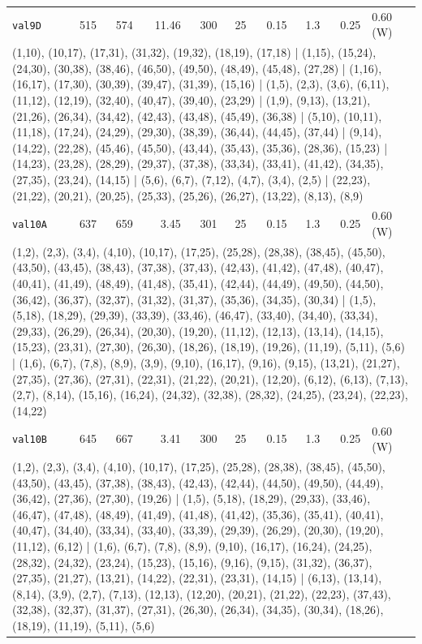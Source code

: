 \begin{longtable}{lrrrrrrrrl}
\texttt{val9D} & 515 & 574 & 11.46 & 300 & 25 & 0.15 & 1.3 & 0.25 & 0.60\,(W) \\
\multicolumn{10}{p{0.96\linewidth}}{\tiny\raggedright\arraybackslash (1,10), (10,17), (17,31), (31,32), (19,32), (18,19), (17,18) | (1,15), (15,24), (24,30), (30,38), (38,46), (46,50), (49,50), (48,49), (45,48), (27,28) | (1,16), (16,17), (17,30), (30,39), (39,47), (31,39), (15,16) | (1,5), (2,3), (3,6), (6,11), (11,12), (12,19), (32,40), (40,47), (39,40), (23,29) | (1,9), (9,13), (13,21), (21,26), (26,34), (34,42), (42,43), (43,48), (45,49), (36,38) | (5,10), (10,11), (11,18), (17,24), (24,29), (29,30), (38,39), (36,44), (44,45), (37,44) | (9,14), (14,22), (22,28), (45,46), (45,50), (43,44), (35,43), (35,36), (28,36), (15,23) | (14,23), (23,28), (28,29), (29,37), (37,38), (33,34), (33,41), (41,42), (34,35), (27,35), (23,24), (14,15) | (5,6), (6,7), (7,12), (4,7), (3,4), (2,5) | (22,23), (21,22), (20,21), (20,25), (25,33), (25,26), (26,27), (13,22), (8,13), (8,9)} \\[2pt]
\texttt{val10A} & 637 & 659 & 3.45 & 301 & 25 & 0.15 & 1.3 & 0.25 & 0.60\,(W) \\
\multicolumn{10}{p{0.96\linewidth}}{\tiny\raggedright\arraybackslash (1,2), (2,3), (3,4), (4,10), (10,17), (17,25), (25,28), (28,38), (38,45), (45,50), (43,50), (43,45), (38,43), (37,38), (37,43), (42,43), (41,42), (47,48), (40,47), (40,41), (41,49), (48,49), (41,48), (35,41), (42,44), (44,49), (49,50), (44,50), (36,42), (36,37), (32,37), (31,32), (31,37), (35,36), (34,35), (30,34) | (1,5), (5,18), (18,29), (29,39), (33,39), (33,46), (46,47), (33,40), (34,40), (33,34), (29,33), (26,29), (26,34), (20,30), (19,20), (11,12), (12,13), (13,14), (14,15), (15,23), (23,31), (27,30), (26,30), (18,26), (18,19), (19,26), (11,19), (5,11), (5,6) | (1,6), (6,7), (7,8), (8,9), (3,9), (9,10), (16,17), (9,16), (9,15), (13,21), (21,27), (27,35), (27,36), (27,31), (22,31), (21,22), (20,21), (12,20), (6,12), (6,13), (7,13), (2,7), (8,14), (15,16), (16,24), (24,32), (32,38), (28,32), (24,25), (23,24), (22,23), (14,22)} \\[2pt]
\texttt{val10B} & 645 & 667 & 3.41 & 300 & 25 & 0.15 & 1.3 & 0.25 & 0.60\,(W) \\
\multicolumn{10}{p{0.96\linewidth}}{\tiny\raggedright\arraybackslash (1,2), (2,3), (3,4), (4,10), (10,17), (17,25), (25,28), (28,38), (38,45), (45,50), (43,50), (43,45), (37,38), (38,43), (42,43), (42,44), (44,50), (49,50), (44,49), (36,42), (27,36), (27,30), (19,26) | (1,5), (5,18), (18,29), (29,33), (33,46), (46,47), (47,48), (48,49), (41,49), (41,48), (41,42), (35,36), (35,41), (40,41), (40,47), (34,40), (33,34), (33,40), (33,39), (29,39), (26,29), (20,30), (19,20), (11,12), (6,12) | (1,6), (6,7), (7,8), (8,9), (9,10), (16,17), (16,24), (24,25), (28,32), (24,32), (23,24), (15,23), (15,16), (9,16), (9,15), (31,32), (36,37), (27,35), (21,27), (13,21), (14,22), (22,31), (23,31), (14,15) | (6,13), (13,14), (8,14), (3,9), (2,7), (7,13), (12,13), (12,20), (20,21), (21,22), (22,23), (37,43), (32,38), (32,37), (31,37), (27,31), (26,30), (26,34), (34,35), (30,34), (18,26), (18,19), (11,19), (5,11), (5,6)} \\[2pt]

\end{longtable}
